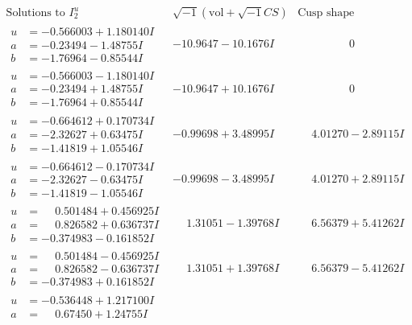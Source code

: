 \documentclass[1p]{elsarticle_modified}
\theoremstyle{definition}
\newcommand{\I}{\sqrt{-1}}
\begin{document}
$$\begin{array}{c|c|c}
\text{Solutions to }I^u_{2}& \I (\text{vol} + \sqrt{-1}CS) & \text{Cusp shape}\\
 \hline 
\begin{aligned}
u &= -0.566003 + 1.180140 I \\
a &= -0.23494 - 1.48755 I \\
b &= -1.76964 - 0.85544 I\end{aligned}
 & -10.9647 - 10.1676 I & \phantom{-0.000000 } 0 \\ \hline\begin{aligned}
u &= -0.566003 - 1.180140 I \\
a &= -0.23494 + 1.48755 I \\
b &= -1.76964 + 0.85544 I\end{aligned}
 & -10.9647 + 10.1676 I & \phantom{-0.000000 } 0 \\ \hline\begin{aligned}
u &= -0.664612 + 0.170734 I \\
a &= -2.32627 + 0.63475 I \\
b &= -1.41819 + 1.05546 I\end{aligned}
 & -0.99698 + 3.48995 I & \phantom{-}4.01270 - 2.89115 I \\ \hline\begin{aligned}
u &= -0.664612 - 0.170734 I \\
a &= -2.32627 - 0.63475 I \\
b &= -1.41819 - 1.05546 I\end{aligned}
 & -0.99698 - 3.48995 I & \phantom{-}4.01270 + 2.89115 I \\ \hline\begin{aligned}
u &= \phantom{-}0.501484 + 0.456925 I \\
a &= \phantom{-}0.826582 + 0.636737 I \\
b &= -0.374983 - 0.161852 I\end{aligned}
 & \phantom{-}1.31051 - 1.39768 I & \phantom{-}6.56379 + 5.41262 I \\ \hline\begin{aligned}
u &= \phantom{-}0.501484 - 0.456925 I \\
a &= \phantom{-}0.826582 - 0.636737 I \\
b &= -0.374983 + 0.161852 I\end{aligned}
 & \phantom{-}1.31051 + 1.39768 I & \phantom{-}6.56379 - 5.41262 I \\ \hline\begin{aligned}
u &= -0.536448 + 1.217100 I \\
a &= \phantom{-}0.67450 + 1.24755 I \\

\end{aligned}
\end{array}$$
\end{document}
